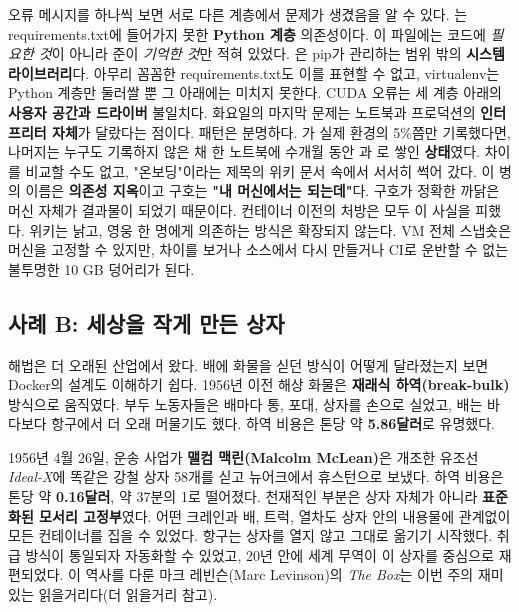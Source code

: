 오류 메시지를 하나씩 보면 서로 다른 계층에서 문제가 생겼음을 알 수 있다. 는 requirements.txt에 들어가지 못한 \textbf{Python 계층} 의존성이다. 이 파일에는 코드에 \textit{필요한 것}이 아니라 준이 \textit{기억한 것}만 적혀 있었다. 은 pip가 관리하는 범위 밖의 \textbf{시스템 라이브러리}다. 아무리 꼼꼼한 requirements.txt도 이를 표현할 수 없고, virtualenv는 Python 계층만 둘러쌀 뿐 그 아래에는 미치지 못한다. CUDA 오류는 세 계층 아래의 \textbf{사용자 공간과 드라이버} 불일치다. 화요일의 마지막 문제는 노트북과 프로덕션의 \textbf{인터프리터 자체}가 달랐다는 점이다. 패턴은 분명하다. 가 실제 환경의 5\%쯤만 기록했다면, 나머지는 누구도 기록하지 않은 채 한 노트북에 수개월 동안 과 로 쌓인 \textbf{상태}였다. 차이를 비교할 수도 없고, "온보딩"이라는 제목의 위키 문서 속에서 서서히 썩어 갔다. 이 병의 이름은 \textbf{의존성 지옥}이고 구호는 \textbf{"내 머신에서는 되는데"}다. 구호가 정확한 까닭은 머신 자체가 결과물이 되었기 때문이다. 컨테이너 이전의 처방은 모두 이 사실을 피했다. 위키는 낡고, 영웅 한 명에게 의존하는 방식은 확장되지 않는다. VM 전체 스냅숏은 머신을 고정할 수 있지만, 차이를 보거나 소스에서 다시 만들거나 CI로 운반할 수 없는 불투명한 10 GB 덩어리가 된다.

\subsection*{사례 B: 세상을 작게 만든 상자}

해법은 더 오래된 산업에서 왔다. 배에 화물을 싣던 방식이 어떻게 달라졌는지 보면 Docker의 설계도 이해하기 쉽다. 1956년 이전 해상 화물은 \textbf{재래식 하역(break-bulk)} 방식으로 움직였다. 부두 노동자들은 배마다 통, 포대, 상자를 손으로 실었고, 배는 바다보다 항구에서 더 오래 머물기도 했다. 하역 비용은 톤당 약 \textbf{5.86달러}로 유명했다.

1956년 4월 26일, 운송 사업가 \textbf{맬컴 맥린(Malcolm McLean)}은 개조한 유조선 \textit{Ideal-X}에 똑같은 강철 상자 58개를 싣고 뉴어크에서 휴스턴으로 보냈다. 하역 비용은 톤당 약 \textbf{0.16달러}, 약 37분의 1로 떨어졌다. 천재적인 부분은 상자 자체가 아니라 \textbf{표준화된 모서리 고정부}였다. 어떤 크레인과 배, 트럭, 열차도 상자 안의 내용물에 관계없이 모든 컨테이너를 집을 수 있었다. 항구는 상자를 열지 않고 그대로 옮기기 시작했다. 취급 방식이 통일되자 자동화할 수 있었고, 20년 안에 세계 무역이 이 상자를 중심으로 재편되었다. 이 역사를 다룬 마크 레빈슨(Marc Levinson)의 \textit{The Box}는 이번 주의 재미있는 읽을거리다(더 읽을거리 참고).

